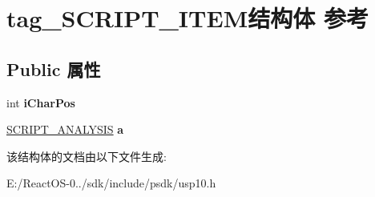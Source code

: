 \hypertarget{structtag___s_c_r_i_p_t___i_t_e_m}{}\section{tag\+\_\+\+S\+C\+R\+I\+P\+T\+\_\+\+I\+T\+E\+M结构体 参考}
\label{structtag___s_c_r_i_p_t___i_t_e_m}
\subsection*{Public 属性}
\begin{DoxyCompactItemize}
\item 
\mbox{\label{structtag___s_c_r_i_p_t___i_t_e_m_a55b4fc56b981b3a812dd90d641ecadc1}} 
int {\bfseries i\+Char\+Pos}
\item 
\mbox{\label{structtag___s_c_r_i_p_t___i_t_e_m_a33ac982c24b615071e6bbae4bf42c830}} 
\hyperlink{structtag___s_c_r_i_p_t___a_n_a_l_y_s_i_s}{S\+C\+R\+I\+P\+T\+\_\+\+A\+N\+A\+L\+Y\+S\+IS} {\bfseries a}
\end{DoxyCompactItemize}


该结构体的文档由以下文件生成\+:\begin{DoxyCompactItemize}
\item 
E\+:/\+React\+O\+S-\/0../sdk/include/psdk/usp10.\+h\end{DoxyCompactItemize}
